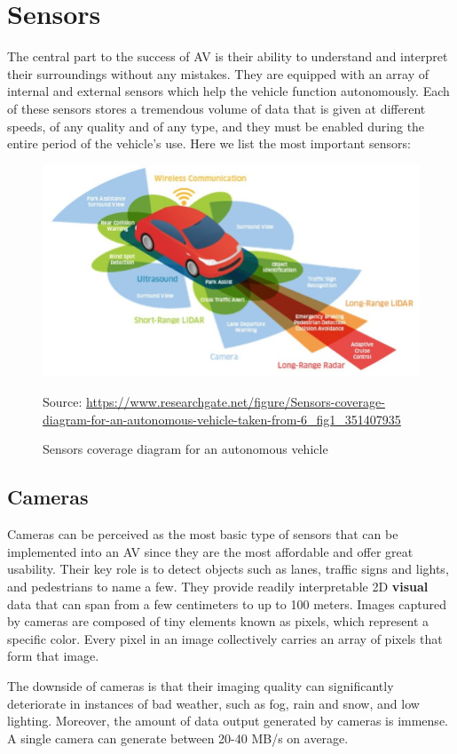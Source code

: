 \documentclass[10pt,oneside,english,a4paper]{article}
\begin{document}

\section{Sensors} \label{sensors}

\indent The central part to the success of AV is their ability to understand and interpret their surroundings without any mistakes. They are equipped with an array of internal and external sensors which help the vehicle function autonomously. Each of these sensors stores a tremendous volume of data that is given at different speeds, of any quality and of any type, and they must be enabled during the entire period of the vehicle's use. Here we list the most important sensors:

\begin{figure}[!h]
\centering
\includegraphics[scale=0.4]{SensorsScheme.png}
\caption{Sensors coverage diagram for an autonomous vehicle}
{Source: \url{https://www.researchgate.net/figure/Sensors-coverage-diagram-for-an-autonomous-vehicle-taken-from-6_fig1_351407935}}
\label{fig:p_sensors}
\end{figure}

\subsection{Cameras}
\indent Cameras can be perceived as the most basic type of sensors that can be implemented into an AV since they are the most affordable and offer great usability. Their key role is to detect objects such as lanes, traffic signs and lights, and pedestrians to name a few. They provide readily interpretable 2D \textbf{visual} data that can span from a few centimeters to up to 100 meters. Images captured by cameras are composed of tiny elements known as pixels, which represent a specific color. Every pixel in an image collectively carries an array of pixels that form that image. 
\par The downside of cameras is that their imaging quality can significantly deteriorate in instances of bad weather, such as fog, rain and snow, and low lighting. Moreover, the amount of data output generated by cameras is immense. A single camera can generate between 20-40 MB/s on average. \cite{functionalarch}\cite{computerarch}\cite{stateoftheart}
\end{document}
